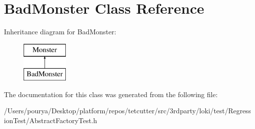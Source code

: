 \hypertarget{classBadMonster}{}\section{Bad\+Monster Class Reference}
\label{classBadMonster}
Inheritance diagram for Bad\+Monster\+:\begin{figure}[H]
\begin{center}
\leavevmode
\includegraphics[height=2.000000cm]{classBadMonster}
\end{center}
\end{figure}


The documentation for this class was generated from the following file\+:\begin{DoxyCompactItemize}
\item 
/\+Users/pourya/\+Desktop/platform/repos/tetcutter/src/3rdparty/loki/test/\+Regression\+Test/Abstract\+Factory\+Test.\+h\end{DoxyCompactItemize}
